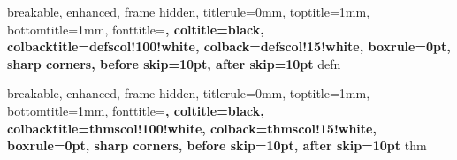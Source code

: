 \usepackage{xcolor}
\usepackage{tcolorbox}
\usepackage{amsmath, amsthm}


{
breakable,
    enhanced,
    frame hidden,
    titlerule=0mm,
    toptitle=1mm,
    bottomtitle=1mm,
    fonttitle=\bfseries\large,
    coltitle=black,
    colbacktitle=defscol!100!white,
    colback=defscol!15!white,
    boxrule=0pt, sharp corners, %
    before skip=10pt, after skip=10pt %
}{defn}



{
breakable,
    enhanced,
    frame hidden,
    titlerule=0mm,
    toptitle=1mm,
    bottomtitle=1mm,
    fonttitle=\bfseries\large,
    coltitle=black,
    colbacktitle=thmscol!100!white,
    colback=thmscol!15!white,
    boxrule=0pt, sharp corners,
    before skip=10pt, after skip=10pt
}{thm}



